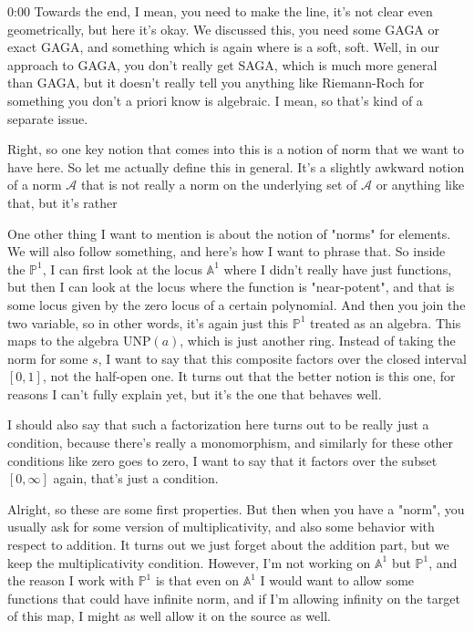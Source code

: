 \begin{unfinished}{0:00}
Towards the end, I mean, you need to make the line, it's not clear even geometrically, but here it's okay. We discussed this, you need some GAGA or exact GAGA, and something which is again where is a soft, soft. Well, in our approach to GAGA, you don't really get SAGA, which is much more general than GAGA, but it doesn't really tell you anything like Riemann-Roch for something you don't a priori know is algebraic. I mean, so that's kind of a separate issue.

Right, so one key notion that comes into this is a notion of norm that we want to have here. So let me actually define this in general. It's a slightly awkward notion of a norm $\mathcal{A}$ that is not really a norm on the underlying set of $\mathcal{A}$ or anything like that, but it's rather


One other thing I want to mention is about the notion of "norms" for elements. We will also follow something, and here's how I want to phrase that. So inside the $\mathbb{P}^1$, I can first look at the locus $\mathbb{A}^1$ where I didn't really have just functions, but then I can look at the locus where the function is "near-potent", and that is some locus given by the zero locus of a certain polynomial. And then you join the two variable, so in other words, it's again just this $\mathbb{P}^1$ treated as an algebra. This maps to the algebra $\mathrm{UNP}(a)$, which is just another ring. Instead of taking the norm for some $s$, I want to say that this composite factors over the closed interval $[0, 1]$, not the half-open one. It turns out that the better notion is this one, for reasons I can't fully explain yet, but it's the one that behaves well.

I should also say that such a factorization here turns out to be really just a condition, because there's really a monomorphism, and similarly for these other conditions like zero goes to zero, I want to say that it factors over the subset $[0, \infty]$ again, that's just a condition.

Alright, so these are some first properties. But then when you have a "norm", you usually ask for some version of multiplicativity, and also some behavior with respect to addition. It turns out we just forget about the addition part, but we keep the multiplicativity condition. However, I'm not working on $\mathbb{A}^1$ but $\mathbb{P}^1$, and the reason I work with $\mathbb{P}^1$ is that even on $\mathbb{A}^1$ I would want to allow some functions that could have infinite norm, and if I'm allowing infinity on the target of this map, I might as well allow it on the source as well.


\end{unfinished}
